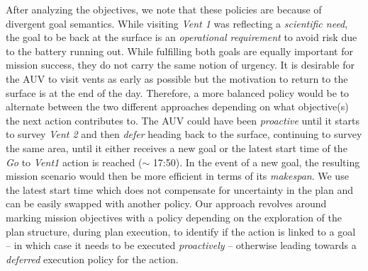 After analyzing the objectives, we note that these policies are
because of divergent goal semantics. While visiting {\em Vent 1} was
reflecting a \emph{scientific need}, the goal to be back at the
surface is an \emph{operational requirement} to avoid risk due to the
battery running out. While fulfilling both goals are equally important
for mission success, they do not carry the same notion of urgency. It
is desirable for the AUV to visit vents as early as possible but the
motivation to return to the surface is at the end of the
day. Therefore, a more balanced policy would be to alternate between
the two different approaches depending on what objective(s) the next
action contributes to. The AUV could have been {\em proactive} until
it starts to survey {\em Vent 2} and then {\em defer} heading back to
the surface, continuing to survey the same area, until it either
receives a new goal or the latest start time of the {\em Go} to
\emph{Vent1} action is reached ($\sim$ 17:50). In the event of a new
goal,
the resulting mission scenario would then be more efficient in terms
of its \emph{makespan}. We use the latest start time which does not
compensate for uncertainty in the plan and can be easily swapped with
another policy.  Our approach revolves around marking mission
objectives with a policy depending on the exploration of the plan
structure, during plan execution, to identify if the action is linked
to a goal -- in which case it needs to be executed {\em proactively}
-- otherwise leading towards a {\em deferred} execution policy for the
action.
 


